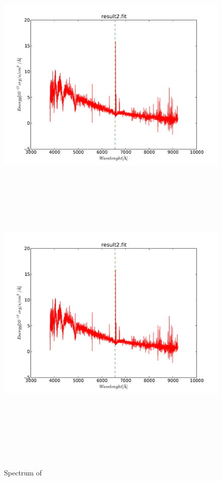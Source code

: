    \begin{figure}[!htbp]
      \begin{center}
        \leavevmode
        \ifpdf
        \includegraphics[scale =.6]{result2}
        \else
        \includegraphics[bb = 92 86 545 742, height=6in]{result2}
        \fi
        \caption{Spectrum of }
        \label{FigResult2}
      \end{center}
    \end{figure}

